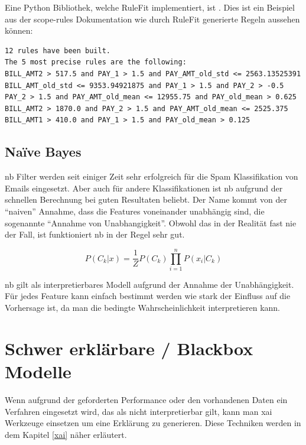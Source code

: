 \documentclass[
  12pt, %
  a4paper, %
  oneside, %
  openany, 
  numbers=noenddot, %
  BCOR=5mm, %
  parskip=half*, %
  thesis, %
]{bfhbook}
\begin{document}
Eine Python Bibliothek, welche RuleFit implementiert, ist \parencite{scopeRules}. Dies ist ein Beispiel aus der scope-rules Dokumentation wie durch RuleFit generierte Regeln aussehen können:
\begin{minipage}[t]{\linewidth}
\begin{lstlisting}
12 rules have been built.
The 5 most precise rules are the following:
BILL_AMT2 > 517.5 and PAY_1 > 1.5 and PAY_AMT_old_std <= 2563.13525391
BILL_AMT_old_std <= 9353.94921875 and PAY_1 > 1.5 and PAY_2 > -0.5
PAY_2 > 1.5 and PAY_AMT_old_mean <= 12955.75 and PAY_old_mean > 0.625
BILL_AMT2 > 1870.0 and PAY_2 > 1.5 and PAY_AMT_old_mean <= 2525.375
BILL_AMT1 > 410.0 and PAY_1 > 1.5 and PAY_old_mean > 0.125
\end{lstlisting}
\end{minipage}

\subsection{Naïve Bayes}
\label{nb}
\Gls{nb} Filter werden seit einiger Zeit sehr erfolgreich für die Spam Klassifikation von Emails eingesetzt. Aber auch für andere Klassifikationen ist \Gls{nb} aufgrund der schnellen Berechnung bei guten Resultaten beliebt. Der Name kommt von der ``naiven'' Annahme, dass die Features voneinander unabhängig sind, die sogenannte  ``Annahme von Unabhangigkeit''. Obwohl das in der Realität fast nie der Fall, ist funktioniert \Gls{nb} in der Regel sehr gut.

\[ P(C_k|x) = \frac{1}{Z}P(C_k) \prod_{i=1}^{n}  P(x_i|C_k) \]

\Gls{nb} gilt als interpretierbares Modell aufgrund der Annahme der Unabhängigkeit. Für jedes Feature kann einfach bestimmt werden wie stark der Einfluss auf die Vorhersage ist, da man die bedingte Wahrscheinlichkeit interpretieren kann.

\section{Schwer erklärbare / Blackbox Modelle}
Wenn aufgrund der geforderten Performance oder den vorhandenen Daten ein Verfahren eingesetzt wird, das als nicht interpretierbar gilt, kann man \Gls{xai} Werkzeuge einsetzen um eine Erklärung zu generieren. Diese Techniken werden in dem Kapitel \ref{xai} näher erläutert.
\end{document}
